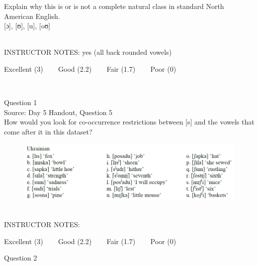 \documentclass[12pt]{article}
\begin{document}
Explain why this is or is not a complete natural class in standard North American English.\\

{[ɔ]}, {[ʊ]}, {[u]}, {[oʊ]}


~\\
INSTRUCTOR NOTES: yes (all back rounded vowels)


\vfill
Excellent (3) ~~~ Good (2.2) ~~~ Fair (1.7) ~~~ Poor (0)
\newpage

\begin{center}
\textbf{{\color{red}{\HUGE END OF EXAM}}}\\

\end{center}
\newpage

\begin{center}
\textbf{{\color{blue}{\HUGE START OF EXAM\\}}}

\textbf{{\color{blue}{\HUGE Student ID: 3347\\}}}

\textbf{{\color{blue}{\HUGE 5:00 - 5:15 PM\\}}}

\end{center}
\newpage

{\large Question 1}\\

Source: Day 5 Handout, Question 5\\

How would you look for co-occurrence restrictions between [s] and the vowels that come after it in this dataset?\\

\begin{figure}[H]
\includegraphics{../images/ukrainian.png}
\end{figure}

~\\
INSTRUCTOR NOTES: 


\vfill
Excellent (3) ~~~ Good (2.2) ~~~ Fair (1.7) ~~~ Poor (0)
\newpage

{\large Question 2}\\
\end{document}
